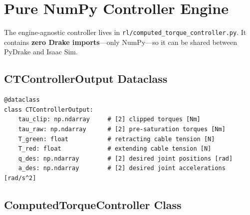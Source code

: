 \documentclass[11pt,a4paper]{article}
\begin{document}
\section{Pure NumPy Controller Engine}
\label{sec:numpy_ct}

The engine-agnostic controller lives in \texttt{rl/computed\_torque\_controller.py}.  It contains \textbf{zero Drake imports}---only NumPy---so it can be shared between PyDrake and Isaac Sim.

\subsection{CTControllerOutput Dataclass}

\begin{lstlisting}[caption={Output bundle from each control cycle.}]
@dataclass
class CTControllerOutput:
    tau_clip: np.ndarray     # [2] clipped torques [Nm]
    tau_raw: np.ndarray      # [2] pre-saturation torques [Nm]
    T_green: float           # retracting cable tension [N]
    T_red: float             # extending cable tension [N]
    q_des: np.ndarray        # [2] desired joint positions [rad]
    a_des: np.ndarray        # [2] desired joint accelerations [rad/s^2]
\end{lstlisting}

\subsection{ComputedTorqueController Class}
\end{document}

